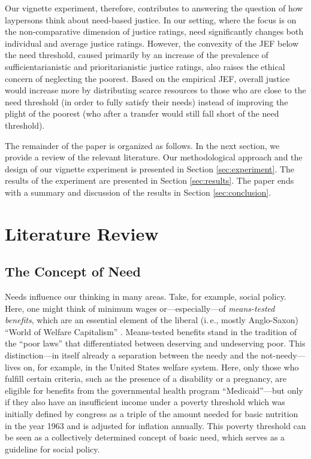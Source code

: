 \documentclass[12pt]{scrartcl}
\begin{document}
Our vignette experiment, therefore, contributes to answering the question of how laypersons think about need-based justice.
In our setting, where the focus is on the non-comparative dimension of justice ratings, need significantly changes both individual and average justice ratings.
However, the convexity of the JEF below the need threshold, caused primarily by an increase of the prevalence of sufficientarianistic and prioritarianistic justice ratings, also raises the ethical concern of neglecting the poorest.
Based on the empirical JEF, overall justice would increase more by distributing scarce resources to those who are close to the need threshold (in order to fully satisfy their needs) instead of improving the plight of the poorest (who after a transfer would still fall short of the need threshold).

The remainder of the paper is organized as follows.
In the next section, we provide a review of the relevant literature.
Our methodological approach and the design of our vignette experiment is presented in Section \ref{sec:experiment}.
The results of the experiment are presented in Section \ref{sec:results}.
The paper ends with a summary and discussion of the results in Section \ref{sec:conclusion}.


\section{Literature Review}\label{sec:background}


\subsection{The Concept of Need}\label{sec:need}
Needs influence our thinking in many areas.
Take, for example, social policy.
Here, one might think of minimum wages or---especially---of \textit{means-tested benefits}, which are an essential element of the liberal (i.\,e., mostly Anglo-Saxon) ``World of Welfare Capitalism'' \citep{esping-andersen_three_1990}.
Means-tested benefits stand in the tradition of the ``poor laws'' that differentiated between deserving and undeserving poor.
This distinction---in itself already a separation between the needy and the not-needy---lives on, for example, in the United States welfare system.
Here, only those who fulfill certain criteria, such as the presence of a disability or a pregnancy, are eligible for benefits from the governmental health program ``Medicaid''---but only if they also have an insufficient income under a poverty threshold which was initially defined by congress as a triple of the amount needed for basic nutrition in the year 1963 and is adjusted for inflation annually.
This poverty threshold can be seen as a collectively determined concept of basic need, which serves as a guideline for social policy.
\end{document}
